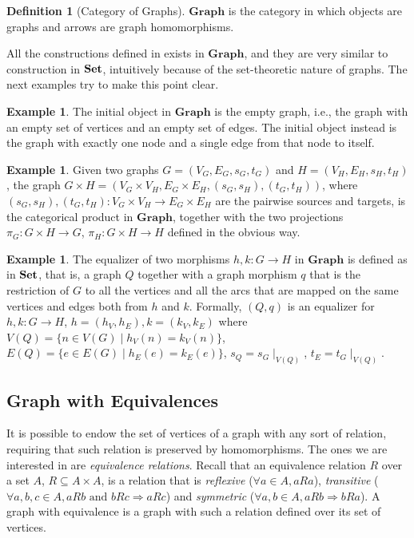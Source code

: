 \documentclass[a4paper, twoside,openright]{report}
\theoremstyle{plain}
\theoremstyle{definition}
\newtheorem{definition}[theorem]{Definition}
\newtheorem{example}[theorem]{Example}
\begin{document}
\begin{definition}[Category of Graphs]\label{def:cat_of_graph}
    $\mathbf{Graph}$ is the category in which objects are graphs and arrows are graph homomorphisms.
\end{definition}

All the constructions defined in  exists in $\mathbf{Graph}$, and they are very similar to construction in $\mathbf{Set}$, intuitively because of the set-theoretic nature of graphs. The next examples try to make this point clear.

\begin{example}\label{ex:in_term_in_graph}
    The initial object in $\mathbf{Graph}$ is the empty graph, i.e., the graph with an empty set of vertices and an empty set of edges. The initial object instead is the graph with exactly one node and a single edge from that node to itself.
\end{example}

\begin{example}
    Given two graphs $G = (V_G, E_G, s_G, t_G)$ and $H=(V_H, E_H, s_H, t_H)$, the graph $G \times H = (V_G\times V_H, E_G \times E_H, (s_G, s_H), (t_G, t_H))$, where $(s_G, s_H), (t_G, t_H):V_G\times V_H \rightarrow E_G \times E_H$ are the pairwise sources and targets, is the categorical product in $\mathbf{Graph}$, together with the two projections $\pi_G: G \times H \rightarrow G$, $\pi_H : G \times H \rightarrow H$ defined in the obvious way.
\end{example}

\begin{example}
    The equalizer of two morphisms $h, k: G \rightarrow H$ in $\mathbf{Graph}$ is defined as in $\mathbf{Set}$, that is,  a graph $Q$ together with a graph morphism $q$ that is the restriction of $G$ to all the vertices and all the arcs that are mapped on the same vertices and edges both from $h$ and $k$. Formally, $(Q, q)$ is an equalizer for $h, k: G \rightarrow H$, $h = (h_V, h_E), k = (k_V, k_E)$ where $V(Q) = \{ n \in V(G) \mid h_V(n) = k_V(n)\}$, $E(Q) = \{ e \in E(G) \mid h_E(e) = k_E(e)\}$, $s_Q = s_G \mid_{V(Q)}$, $t_E = t_G \mid_{V(Q)}$.
\end{example}

\subsection{Graph with Equivalences}

It is possible to endow the set of vertices of a graph with any sort of relation, requiring that such relation is preserved by homomorphisms. The ones we are interested in are \emph{equivalence relations}. Recall that an equivalence relation $R$ over a set $A$, $R \subseteq A\times A$, is a relation that is \emph{reflexive} ($\forall a \in A, aRa$), \emph{transitive} ($\forall a, b, c \in A, aRb \text{ and } bRc \Rightarrow aRc$) and \emph{symmetric} ($\forall a, b \in A, aRb \Rightarrow bRa$). A graph with equivalence is a graph with such a relation defined over its set of vertices.
\end{document}
